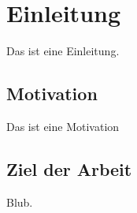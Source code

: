 \chapter{Einleitung}
\label{cha:Einleitung}
Das ist eine Einleitung.

\section{Motivation}
\label{sec:Motivation}
Das ist eine Motivation

\section{Ziel der Arbeit}
\label{sec:ZielDerArbeit}
Blub.